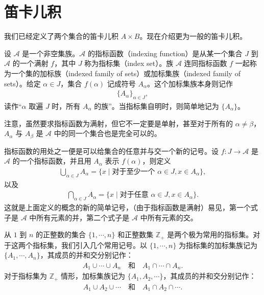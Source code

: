 \documentclass[../../main.tex]{subfiles}
\begin{document}
\section{笛卡儿积}\label{section:ch01-笛卡儿积}

我们已经定义了两个集合的笛卡儿积 $A \times B$。现在介绍更为一般的笛卡儿积。

\begin{definition}[加标集族]\label{definition:ch01-加标集族}
设 $\mathcal{A}$ 是一个非空集族。$\mathcal{A}$ 的指标函数（indexing function）是从某一个集合 $J$ 到 $\mathcal{A}$ 的一个满射 $f$，其中 $J$ 称为指标集（index set）。族 $\mathcal{A}$ 连同指标函数 $f$ 一起称为一个集的加标族（indexed family of sets）或加标集族（indexed family of sets）。给定 $\alpha \in J$，集合 $f(\alpha)$ 记成符号 $A_{\alpha}$。这个加标集族本身则记作
\begin{align*}
\{A_{\alpha}\}_{\alpha \in J},
\end{align*}
读作“$\alpha$ 取遍 $J$ 时，所有 $A_{\alpha}$ 的族”。当指标集自明时，则简单地记为 $\{A_{\alpha}\}$。
\end{definition}

注意，虽然要求指标函数为满射，但它不一定要是单射，甚至对于所有的 $\alpha \neq \beta$，$A_{\alpha}$ 与 $A_{\beta}$ 是 $\mathcal{A}$ 中的同一个集合也是完全可以的。

指标函数的用处之一便是可以给集合的任意并与交一个新的记号。设 $f: J \longrightarrow \mathcal{A}$ 是 $\mathcal{A}$ 的一个指标函数，并且用 $A_{\alpha}$ 表示 $f(\alpha)$，则定义
\begin{align}
\bigcup_{\alpha \in J} A_{\alpha} = \{x \mid \text{对于至少一个 } \alpha \in J, x \in A_{\alpha}\},\label{align:ch01-加标任意并}
\end{align}
以及
\begin{align}
\bigcap_{\alpha \in J} A_{\alpha} = \{x \mid \text{对于任意 } \alpha \in J, x \in A_{\alpha}\}.\label{align:ch01-加标任意交}
\end{align}
这就是上面定义的概念的新的简单记号，（由于指标函数是满射）易见，第一个式子是 $\mathcal{A}$ 中所有元素的并，第二个式子是 $\mathcal{A}$ 中所有元素的交。

从 $1$ 到 $n$ 的正整数的集合 $\{1, \cdots, n\}$ 和正整数集 $\mathbb{Z}_{+}$ 是两个极为常用的指标集。对于这两个指标集，我们引入几个常用记号。以 $\{1, \cdots, n\}$ 为指标集的加标集族记为 $\{A_{1}, \cdots, A_{n}\}$，其成员的并和交分别记作：
\begin{align*}
A_{1} \cup \cdots \cup A_{n} \quad \text{和} \quad A_{1} \cap \cdots \cap A_{n}.
\end{align*}
对于指标集为 $\mathbb{Z}_{+}$ 情形，加标集族记为 $\{A_{1}, A_{2}, \cdots\}$，其成员的并和交分别记作：
\begin{align*}
A_{1} \cup A_{2} \cup \cdots \quad \text{和} \quad A_{1} \cap A_{2} \cap \cdots.
\end{align*}
\end{document}
